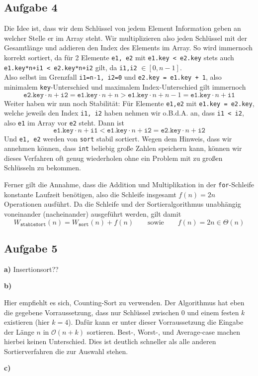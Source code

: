 \documentclass[a4paper,graphics,11pt]{article}
\newcommand{\aufgabe}[1]{\subsection*{Aufgabe #1}}
\begin{document}
\aufgabe{4}

Die Idee ist, dass wir dem Schlüssel von jedem Element Information geben an welcher Stelle er im Array steht. Wir multiplizieren
also jeden Schlüssel mit der Gesamtlänge und addieren den Index des Elements im Array. So wird immernoch korrekt sortiert,
da für 2 Elemente \texttt{e1, e2} mit \texttt{e1.key < e2.key} stets auch \texttt{e1.key*n+i1 < e2.key*n+i2} gilt, da
\texttt{i1,i2} $\in [0, n-1]$.\\
Also selbst im Grenzfall \texttt{i1=n-1, i2=0} und \texttt{e2.key = e1.key + 1}, also minimalem \texttt{key}-Unterschied
und maximalem Index-Unterschied gilt immernoch
$$
    \texttt{e2.key}\cdot n + \texttt{i2} = \texttt{e1.key}\cdot n + n > \texttt{e1.key}\cdot n + n-1 = \texttt{e1.key}\cdot n +\texttt{i1}
$$
Weiter haben wir nun noch Stabilität: Für Elemente \texttt{e1,e2} mit \texttt{e1.key = e2.key}, welche
jeweils den Index \texttt{i1, i2} haben nehmen wir o.B.d.A. an, dass \texttt{i1 < i2}, also \texttt{e1} im Array
vor \texttt{e2} steht. Dann ist
$$
    \texttt{e1.key}\cdot n + \texttt{i1} < \texttt{e1.key}\cdot n + \texttt{i2} = \texttt{e2.key}\cdot n + \texttt{i2}
$$
Und \texttt{e1, e2} werden von \texttt{sort} stabil sortiert. Wegen dem Hinweis, dass wir annehmen können, dass
\texttt{int} beliebig große Zahlen speichern kann, können wir dieses Verfahren oft genug wiederholen ohne ein Problem
mit zu großen Schlüsseln zu bekommen.

Ferner gilt die Annahme, dass die Addition und Multiplikation in der \texttt{for}-Schleife konstante Laufzeit benötigen,
also die Schleife insgesamt $f(n) = 2n$ Operationen ausführt. Da die Schleife und der Sortieralgorithmus unabhängig voneinander
(nacheinander) ausgeführt werden, gilt damit
$$
    W_{\texttt{stableSort}}(n) = W_{\texttt{sort}}(n) + f(n)
    \qquad\text{sowie}\qquad
    f(n) = 2n \in \Theta(n)
$$

\aufgabe{5}
\textbf{a)}
Insertionsort??

\newpage
\textbf{b)}

Hier empfiehlt es sich, Counting-Sort zu verwenden. Der Algorithmus hat eben die gegebene Vorraussetzung, dass
nur Schlüssel zwischen 0 und einem festen $k$ existieren (hier $k=4$). Dafür kann er unter dieser Vorraussetzung
die Eingabe der Länge $n$ in $\mathcal{O}(n+k)$ sortieren. Best-, Worst-, und Average-case machen hierbei keinen Unterschied.
Dies ist deutlich schneller als alle anderen Sortierverfahren die zur Auswahl stehen.

\textbf{c)}
\end{document}
